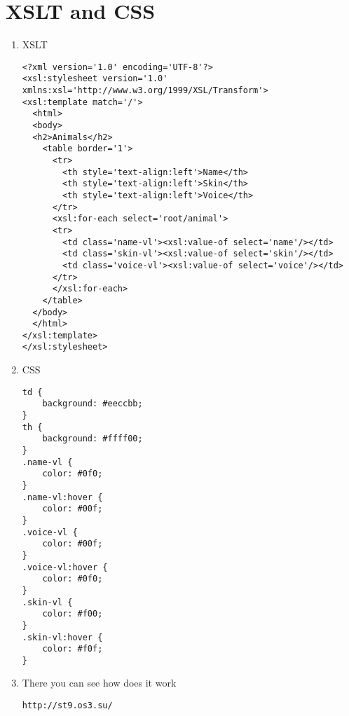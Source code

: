 \documentclass[10pt]{article}
\begin{document}
\section*{XSLT and CSS \\}
\begin{enumerate}
\item XSLT
\begin{verbatim}
<?xml version='1.0' encoding='UTF-8'?>
<xsl:stylesheet version='1.0' xmlns:xsl='http://www.w3.org/1999/XSL/Transform'>
<xsl:template match='/'>
  <html>
  <body>
  <h2>Animals</h2>
    <table border='1'>
      <tr>
        <th style='text-align:left'>Name</th>
        <th style='text-align:left'>Skin</th>
        <th style='text-align:left'>Voice</th>
      </tr>
      <xsl:for-each select='root/animal'>
      <tr>
        <td class='name-vl'><xsl:value-of select='name'/></td>
        <td class='skin-vl'><xsl:value-of select='skin'/></td>
        <td class='voice-vl'><xsl:value-of select='voice'/></td>
      </tr>
      </xsl:for-each>
    </table>
  </body>
  </html>
</xsl:template>
</xsl:stylesheet>
\end{verbatim}

\item CSS
\begin{verbatim}
td {
    background: #eeccbb;
}
th {
    background: #ffff00;  
}
.name-vl {
    color: #0f0;
}
.name-vl:hover {
    color: #00f;
}
.voice-vl {
    color: #00f;
}
.voice-vl:hover {
    color: #0f0;
}
.skin-vl {
    color: #f00;
}
.skin-vl:hover {
    color: #f0f;
}
\end{verbatim}

\item There you can see how does it work
\begin{verbatim}
http://st9.os3.su/
\end{verbatim}
\end{enumerate} 
\end{document}
